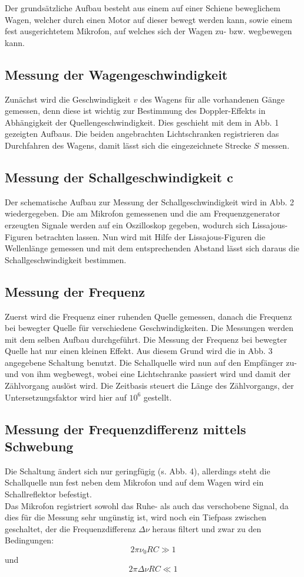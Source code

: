 Der grundsätzliche Aufbau besteht aus einem auf einer Schiene beweglichem Wagen, welcher durch einen Motor auf dieser bewegt werden kann, sowie einem fest ausgerichtetem Mikrofon, auf welches sich der Wagen zu- bzw. wegbewegen kann.
\subsection{Messung der Wagengeschwindigkeit}
Zunächst wird die Geschwindigkeit $v$ des Wagens für alle vorhandenen Gänge gemessen, denn diese ist wichtig zur Bestimmung des Doppler-Effekts in Abhängigkeit der Quellengeschwindigkeit. Dies geschieht mit dem in Abb. 1 gezeigten Aufbaus. Die beiden angebrachten Lichtschranken registrieren das Durchfahren des Wagens, damit lässt sich die eingezeichnete Strecke $S$ messen.
\subsection{Messung der Schallgeschwindigkeit c}
Der schematische Aufbau zur Messung der Schallgeschwindigkeit wird in Abb. 2 wiedergegeben. Die am Mikrofon gemessenen und die am Frequenzgenerator erzeugten Signale werden auf ein Oszilloskop gegeben, wodurch sich Lissajous-Figuren betrachten lassen. Nun wird mit Hilfe der Lissajous-Figuren die Wellenlänge gemessen und mit dem entsprechenden Abstand lässt sich daraus die Schallgeschwindigkeit bestimmen. 
\subsection{Messung der Frequenz}
Zuerst wird die Frequenz einer ruhenden Quelle gemessen, danach die Frequenz bei bewegter Quelle für verschiedene Geschwindigkeiten. Die Messungen werden mit dem selben Aufbau durchgeführt.
Die Messung der Frequenz bei bewegter Quelle hat nur einen kleinen Effekt. Aus diesem Grund wird die in Abb. 3 angegebene Schaltung benutzt.
Die Schallquelle wird nun auf den Empfänger zu- und von ihm
wegbewegt, wobei eine Lichtschranke passiert wird und damit der Zählvorgang
auslöst wird. Die Zeitbasis steuert die Länge des Zählvorgangs, der Untersetzungsfaktor wird hier auf $10^6$ gestellt.
\subsection{Messung der Frequenzdifferenz mittels Schwebung}
Die Schaltung ändert sich nur geringfügig (s. Abb. 4), allerdings steht die Schallquelle nun fest neben dem Mikrofon und auf dem Wagen wird ein Schallreflektor befestigt. \\
Das Mikrofon registriert sowohl das Ruhe- als auch das verschobene Signal, da dies für die Messung sehr ungünstig ist, wird noch ein Tiefpass zwischen geschaltet, der die Frequenzdifferenz $\Delta\nu$ heraus filtert und zwar zu den Bedingungen:
\begin{equation*}
2\pi\nu_0 RC \gg 1
\end{equation*}
und
\begin{equation*}
2\pi\Delta\nu RC \ll 1
\end{equation*}
